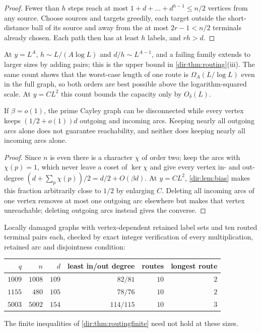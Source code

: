 \begin{proof}
Fewer than $h$ steps reach at most $1+d+\dots+d^{h-1}\le n/2$ vertices from any source. Choose sources and
targets greedily, each target outside the short-distance ball of its source and away from the at most
$2r-1<n/2$ terminals already chosen. Each path then has at least $h$ labels, and $rh>d$.
\end{proof}

At $y=L^A$, $h\sim L/(A\log L)$ and $d/h\sim L^{A-1}$, and a failing family extends to larger sizes by
adding pairs; this is the upper bound in \cref{dir:thm:routing}(iii). The same count shows that the
worst-case length of one route is $\Omega_A(L/\log L)$ even in the full graph, so both orders are best
possible above the logarithm-squared scale. At $y=CL^2$ this count bounds the capacity only by $O_\delta(L)$.

\begin{proposition}\label{dir:prop:routingsharp}
If $\beta=o(1)$, the prime Cayley graph can be disconnected while every vertex keeps $(1/2+o(1))d$
outgoing and incoming arcs. Keeping nearly all outgoing arcs alone does not guarantee reachability, and
neither does keeping nearly all incoming arcs alone.
\end{proposition}

\begin{proof}
Since $n$ is even there is a character $\chi$ of order two; keep the arcs with $\chi(p)=1$, which never
leave a coset of $\ker\chi$ and give every vertex in- and out-degree $(d+\sum_p\chi(p))/2=d/2+O(\beta d)$. At
$y=CL^2$, \cref{dir:lem:bias} makes this fraction arbitrarily close to $1/2$ by enlarging $C$. Deleting all
incoming arcs of one vertex removes at most one outgoing arc elsewhere but makes that vertex unreachable;
deleting outgoing arcs instead gives the converse.
\end{proof}

\begin{example}\label{dir:ex:routing}
Locally damaged graphs with vertex-dependent retained label sets and ten routed terminal pairs each,
checked by exact integer verification of every multiplication, retained arc and disjointness condition:
\begin{center}\small
\begin{tabular}{rrrrrr}
\toprule
$q$ & $n$ & $d$ & least in/out degree & routes & longest route\\
\midrule
$1009$ & $1008$ & $109$ & $82/81$ & $10$ & $2$\\
$1155$ & $480$ & $105$ & $78/76$ & $10$ & $2$\\
$5003$ & $5002$ & $154$ & $114/115$ & $10$ & $3$\\
\bottomrule
\end{tabular}
\end{center}
The finite inequalities of \cref{dir:thm:routingfinite} need not hold at these sizes.
\end{example}

